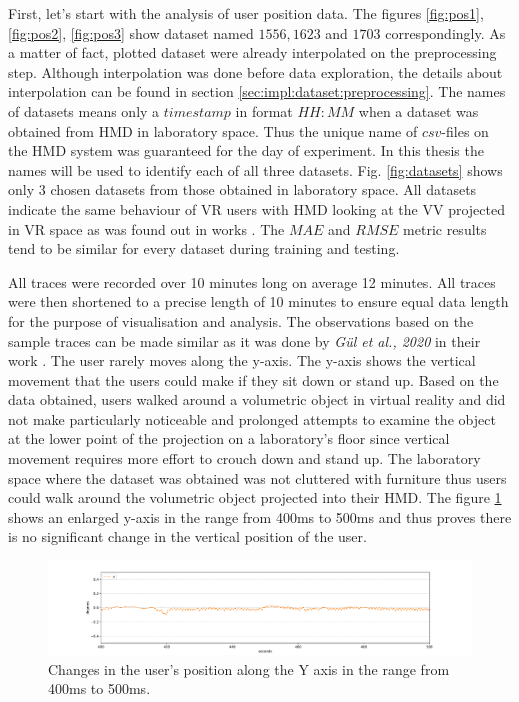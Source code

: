 First, let's start with the analysis of user position data. The figures \ref{fig:pos1}, \ref{fig:pos2}, \ref{fig:pos3} show dataset named $1556, 1623$ and $1703$ correspondingly. As a matter of fact, plotted dataset were already interpolated on the preprocessing step. Although interpolation was done before data exploration, the details about interpolation can be found in section \ref*{sec:impl:dataset:preprocessing}. The names of datasets means only a $timestamp$ in format $HH:MM$ when a dataset was obtained from HMD in laboratory space. Thus the unique name of $csv$-files on the HMD system was guaranteed for the day of experiment. In this thesis the names will be used to identify each of all three datasets. Fig. \ref{fig:datasets} shows only 3 chosen datasets from those obtained in laboratory space. All datasets indicate the same behaviour of VR users with HMD looking at the VV projected in VR space as was found out in works \cite{serhan_kalman, user_behav_volumetric}. The $MAE$ and $RMSE$ metric results tend to be similar for every dataset during training and testing.

All traces were recorded over 10 minutes long on average 12 minutes. All traces were then shortened to a precise length of 10 minutes to ensure equal data length for the purpose of visualisation and analysis. The observations based on the sample traces can be made similar as it was done by \textit{Gül et al., 2020} in their work \cite{serhan_kalman}. The user rarely moves along the y-axis. The y-axis shows the vertical movement that the users could make if they sit down or stand up. Based on the data obtained, users walked around a volumetric object in virtual reality and did not make particularly noticeable and prolonged attempts to examine the object at the lower point of the projection on a laboratory's floor since vertical movement requires more effort to crouch down and stand up. The laboratory space where the dataset was obtained was not cluttered with furniture thus users could walk around the volumetric object projected into their HMD. The figure \ref{fig:y_pos} shows an enlarged y-axis in the range from 400ms to 500ms and thus proves there is no significant change in the vertical position of the user.

\begin{figure}[htb]
	\begin{center}
		\includegraphics[width=1\textwidth, keepaspectratio]{gfx/Fig-1556-y_position.pdf}
		\caption{\label{fig:y_pos} Changes in the user's position along the Y axis in the range from 400ms to 500ms.}
	\end{center}
\end{figure}

